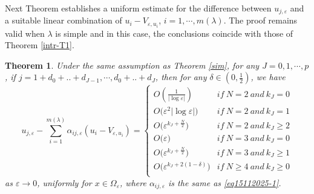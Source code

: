\documentclass[11pt,reqno]{article}
\newtheorem{teo}{Theorem}[section]
\numberwithin{equation}{section}
\newcommand\e\varepsilon
\renewcommand\O\Omega
\begin{document}
Next Theorem establishes  a uniform estimate for the difference between $u_{j,\e}$ and a suitable linear combination of $u_i-V_{\e,u_i}$, $i=1,\cdots,m(\lambda)$.  The proof  remains valid when $\lambda$ is simple and in this case, the conclusions coincide with those of  Theorem \ref{intr-T1}. 
\begin{teo}\label{th-2204}
    Under the same assumption as Theorem \ref{sim}, for any $J=0,1,\cdots,p$, if $j=1+d_0+..+d_{J-1},\cdots,d_0+..+d_J$, then  for any $\delta\in (0,\frac{1}{2})$, we have 
     \begin{equation}\label{M2}
     u_{j,\e}-\sum_{i=1}^{m(\lambda)}\alpha_{ij,\e}(u_i-V_{\e,u_i})=\begin{cases}
                O\left(\frac{1}{|\log\e|}\right)\quad& if  \ N=2  \ and\ k_J=0\\
                O\big(\e^2|\log\e|\big) & if  \ N=2  \ and\ k_J=1\\
                O\big(\e^{k_J+\frac{N}{2}}\big) & if  \ N=2  \ and\ k_J\ge 2\\
                O\big(\e\big) & if  \ N=3  \ and\ k_J=0\\
                O\big(\e^{k_J+\frac{N}{2}}\big) & if  \ N=3  \ and\ k_J\ge 1\\
                 O\big(\e^{k_J+ 2(1-\delta)}\big) & if  \ N\ge 4  \ and\ k_J\ge 0\\
			\end{cases}
\end{equation}
as $\e\to 0$, uniformly for $x\in\O_\e$,
where $\alpha_{ij,\e}$ is the same as \eqref{eq15112025-1}.
\end{teo}
\end{document}
